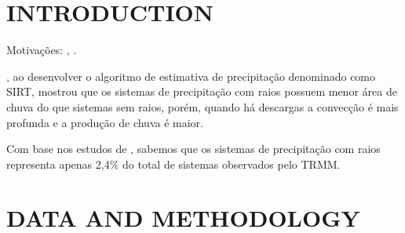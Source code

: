 \documentclass[preprint,authoryear,3p]{elsarticle}
\begin{document}
\begin{multicols}{2}

\section{INTRODUCTION}

Motivações: \citep{morales2003}, \cite{cecil2005}.

\cite{morales2003}, ao desenvolver o algoritmo de estimativa de precipitação denominado como SIRT, mostrou que os sistemas de precipitação com raios possuem menor área de chuva do que sistemas sem raios, porém, quando há descargas a convecção é mais profunda e a produção de chuva é maior.

Com base nos estudos de \cite{cecil2005}, sabemos que os sistemas de precipitação com raios representa apenas 2,4\% do total de sistemas observados pelo TRMM.






\section{DATA AND METHODOLOGY}
 


\end{multicols}
\end{document}
